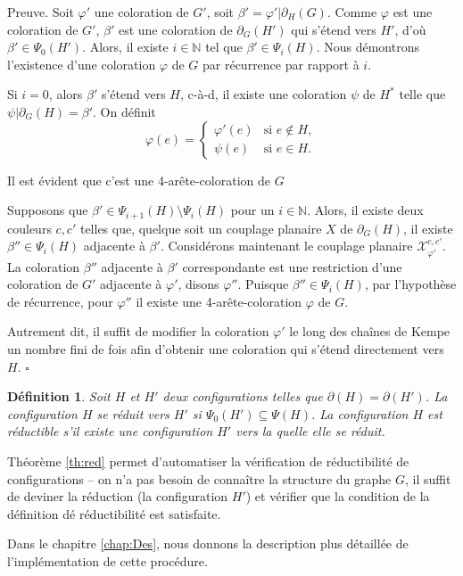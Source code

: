 \documentclass[10pt,a4paper]{article}
\newtheorem{definition}{Définition}
\newcommand{\ep}{{\hfill $\square$}}
\begin{document}
Preuve. Soit $\varphi'$ une coloration de $G'$, soit $\beta'=\varphi'|\partial_H(G)$. Comme $\varphi$ est une coloration de $G'$, $\beta'$ est une coloration de $\partial_G(H')$ qui s'étend vers $H'$, d'où $\beta'\in \Psi_0(H')$.
Alors, il existe $i\in \mathbb{N}$ tel que $\beta' \in \Psi_{i}(H)$.
Nous démontrons l'existence d'une coloration $\varphi$ de $G$ par récurrence par rapport à $i$.

Si $i=0$, alors $\beta'$ s'étend vers $H$, c-à-d, il existe une coloration $\psi$ de $H^*$ telle que $\psi|\partial_G(H)=\beta'$. On définit
$$
\varphi (e) = 
\begin{cases}
\varphi'(e) & \text{si }e\notin H, \\
\psi(e) & \text{si } e\in H.
\end{cases}
$$

Il est évident que c'est une 4-arête-coloration de $G$

Supposons que $\beta' \in \Psi_{i+1}(H)\setminus \Psi_i(H)$ pour un $i\in \mathbb{N}$. Alors, il existe deux couleurs $c,c'$ telles que, quelque soit un couplage planaire $X$ de $\partial_G(H)$, il existe $\beta''\in \Psi_i(H)$ adjacente à $\beta'$. Considérons maintenant le couplage planaire $\mathcal{X}_{\varphi'}^{c,c'}$. La coloration $\beta''$ adjacente à $\beta'$ correspondante est une restriction d'une coloration de $G'$ adjacente à $\varphi'$, disons $\varphi''$. Puisque $\beta''\in \Psi_i(H)$, par l'hypothèse de récurrence, pour $\varphi''$ il existe une 4-arête-coloration $\varphi$ de $G$.

Autrement dit, il suffit de modifier la coloration $\varphi'$ le long des chaînes de Kempe un nombre fini de fois afin d'obtenir une coloration qui s'étend directement vers $H$. \ep

\begin{definition}
Soit $H$ et $H'$ deux configurations telles que $\partial(H)=\partial(H')$. La configuration $H$ \emph{se réduit} vers $H'$ si $\Psi_0(H')\subseteq \Psi(H)$. La configuration $H$ est \emph{réductible} s'il existe une configuration $H'$ vers la quelle elle se réduit.
\end{definition}

Théorème \ref{th:red} permet d'automatiser la vérification de réductibilité de configurations -- on n'a pas besoin de connaître la structure du graphe $G$, il suffit de deviner la réduction (la configuration $H'$) et vérifier que la condition de la définition dé réductibilité est satisfaite.

Dans le chapitre \ref{chap:Des}, nous donnons la description plus détaillée de l'implémentation de cette procédure.%
\end{document}
